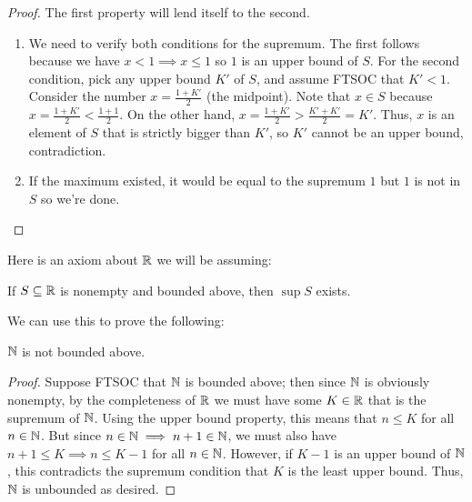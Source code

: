 \documentclass[main.tex]{subfiles}
\begin{document}
\begin{proof}
    The first property will lend itself to the second.
    \begin{enumerate}
        \item We need to verify both conditions for the supremum. The first follows because we have $x < 1\implies x \le 1$ so $1$ is an upper bound of $S$. For the second condition, pick any upper bound $K'$ of $S$, and assume FTSOC that $K' < 1$. Consider the number $x = \frac{1 + K'}{2}$ (the midpoint). Note that $x\in S$ because $x = \frac{1 + K'}{2} < \frac{1 + 1}{2}$. On the other hand, $x = \frac{1 + K'}{2} > \frac{K' + K'}{2} = K'$. Thus, $x$ is an element of $S$ that is strictly bigger than $K'$, so $K'$ cannot be an upper bound, contradiction.
        \item If the maximum existed, it would be equal to the supremum $1$ but $1$ is not in $S$ so we're done.\qedhere
    \end{enumerate}
\end{proof}

Here is an axiom about $\RR$ we will be assuming:
\begin{theorem}[Completeness of $\RR$]
    If $S\subseteq \mathbb R$ is nonempty and bounded above, then $\sup S$ exists.
\end{theorem}

We can use this to prove the following:
\begin{proposition}
    $\mathbb N$ is not bounded above.
\end{proposition}

\begin{proof}
    Suppose FTSOC that $\mathbb N$ is bounded above; then since $\mathbb N$ is obviously nonempty, by the completeness of $\RR$ we must have some $K\in \mathbb R$ that is the supremum of $\mathbb N$. Using the upper bound property, this means that $n \le K$ for all $n\in \mathbb N$. But since $n\in \mathbb N\implies n + 1\in \mathbb N$, we must also have $n + 1\le K\implies n\le K - 1$ for all $n\in \mathbb N$. However, if $K - 1$ is an upper bound of $\mathbb N$, this contradicts the supremum condition that $K$ is the least upper bound. Thus, $\mathbb N$ is unbounded as desired.
\end{proof}
\end{document}
